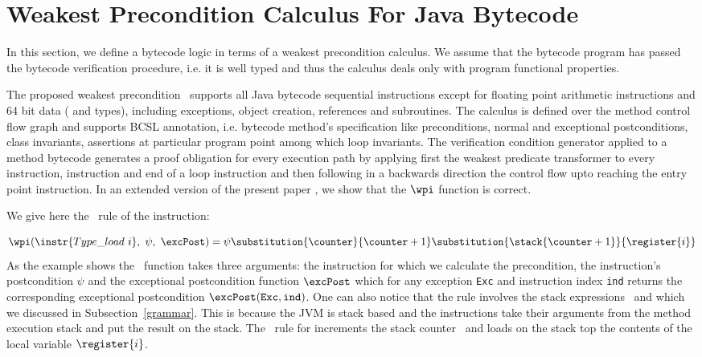 
\section{Weakest Precondition Calculus For Java Bytecode}\label{wpbc}
In this section, we define a bytecode logic in terms of a weakest precondition calculus.
We assume that the bytecode program has passed the bytecode verification procedure, i.e. it is well typed and
 thus the calculus deals only with program functional properties. 

The proposed weakest precondition \wpi \ supports all Java bytecode sequential instructions except for floating point
 arithmetic instructions and 64 bit data ( and  types), including exceptions, object creation,
 references and subroutines. The calculus is defined over the method control flow graph and supports BCSL annotation,
 i.e. bytecode method's specification like preconditions, normal and exceptional postconditions, class invariants,
 assertions at particular program point among which loop invariants. The verification condition generator applied to a method 
bytecode generates a proof obligation for every execution path
 by applying first the weakest predicate transformer to every  instruction,
  instruction and end of a loop instruction and then following in a backwards direction the control
 flow upto reaching the entry point instruction.
 In an extended version of the present paper \cite{JBL05MP}, we show that the $\wpi$ function is correct.

We give here the \wpi \ rule of the   instruction:

\[\wpi(\instr{Type\_load \ i}, \ \psi, \ \excPost) = \psi\substitution{\counter }{\counter+1} \substitution{\stack{\counter+1}}{\register{i}}
\] 
 As the example shows the \wpi \ function takes three arguments:
the instruction for which we calculate the precondition, 
the instruction's postcondition $\psi$ and the exceptional postcondition function $\excPost$ which for any exception \texttt{Exc} and 
instruction index \texttt{ind} returns the
corresponding exceptional postcondition $\excPost(\texttt{Exc}, \tt{ind})$. One can also notice that the rule involves the stack expressions \counter \ and \stack{\counter} which we discussed in Subsection~\ref{grammar}.
 This is because the JVM is stack based and the instructions take their arguments from the method execution stack and 
 put the result on the stack.
 The \wpi \ rule for   increments the stack counter \counter \ and loads on the stack top the contents
 of the local variable $\register{i}$. 




